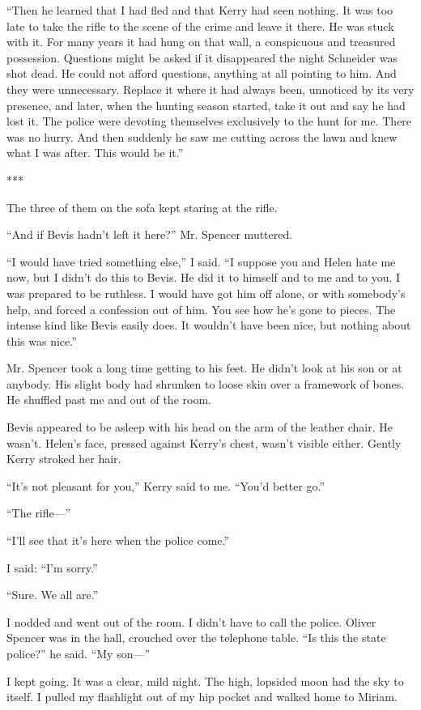 \documentclass{novel}
\begin{document}
“Then he learned that I had fled and that Kerry had seen nothing. It was too late to take the rifle to the scene of the crime and leave it there. He was stuck with it. For many years it had hung on that wall, a conspicuous and treasured possession. Questions might be asked if it disappeared the night Schneider was shot dead. He could not afford questions, anything at all pointing to him. And they were unnecessary. Replace it where it had always been, unnoticed by its very presence, and later, when the hunting season started, take it out and say he had lost it. The police were devoting themselves exclusively to the hunt for me. There was no hurry. And then suddenly he saw me cutting across the lawn and knew what I was after. This would be it.”

***

The three of them on the sofa kept staring at the rifle.

“And if Bevis hadn’t left it here?” Mr. Spencer muttered.

“I would have tried something else,” I said. “I suppose you and Helen hate me now, but I didn’t do this to Bevis. He did it to himself and to me and to you. I was prepared to be ruthless. I would have got him off alone, or with somebody’s help, and forced a confession out of him. You see how he’s gone to pieces. The intense kind like Bevis easily does. It wouldn’t have been nice, but nothing about this was nice.”

Mr. Spencer took a long time getting to his feet. He didn’t look at his son or at anybody. His slight body had shrunken to loose skin over a framework of bones. He shuffled past me and out of the room.

Bevis appeared to be asleep with his head on the arm of the leather chair. He wasn’t. Helen’s face, pressed against Kerry’s chest, wasn’t visible either. Gently Kerry stroked her hair.

“It’s not pleasant for you,” Kerry said to me. “You’d better go.”

“The rifle—”

“I’ll see that it’s here when the police come.”

I said: “I’m sorry.”

“Sure. We all are.”

I nodded and went out of the room. I didn’t have to call the police. Oliver Spencer was in the hall, crouched over the telephone table. “Is this the state police?” he said. “My son—”

I kept going. It was a clear, mild night. The high, lopsided moon had the sky to itself. I pulled my flashlight out of my hip pocket and walked home to Miriam.
\end{document}

